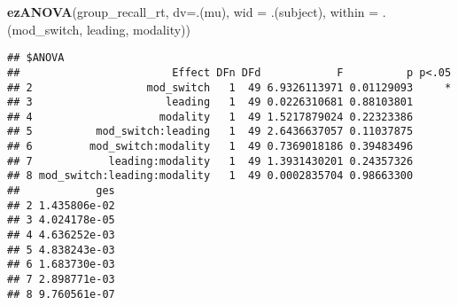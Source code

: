 \documentclass[]{article}
\newenvironment{Shaded}{\begin{snugshade}}{\end{snugshade}}
\newcommand{\DataTypeTok}[1]{\textcolor[rgb]{0.13,0.29,0.53}{#1}}
\newcommand{\KeywordTok}[1]{\textcolor[rgb]{0.13,0.29,0.53}{\textbf{#1}}}
\newcommand{\NormalTok}[1]{#1}
\begin{document}
\begin{Shaded}
\begin{Highlighting}[]
\KeywordTok{ezANOVA}\NormalTok{(group_recall_rt, }\DataTypeTok{dv=}\NormalTok{.(mu), }\DataTypeTok{wid =}\NormalTok{ .(subject), }\DataTypeTok{within =}\NormalTok{ .(mod_switch, leading, modality))}
\end{Highlighting}
\end{Shaded}

\begin{verbatim}
## $ANOVA
##                        Effect DFn DFd            F          p p<.05
## 2                  mod_switch   1  49 6.9326113971 0.01129093     *
## 3                     leading   1  49 0.0226310681 0.88103801      
## 4                    modality   1  49 1.5217879024 0.22323386      
## 5          mod_switch:leading   1  49 2.6436637057 0.11037875      
## 6         mod_switch:modality   1  49 0.7369018186 0.39483496      
## 7            leading:modality   1  49 1.3931430201 0.24357326      
## 8 mod_switch:leading:modality   1  49 0.0002835704 0.98663300      
##            ges
## 2 1.435806e-02
## 3 4.024178e-05
## 4 4.636252e-03
## 5 4.838243e-03
## 6 1.683730e-03
## 7 2.898771e-03
## 8 9.760561e-07
\end{verbatim}
\end{document}

